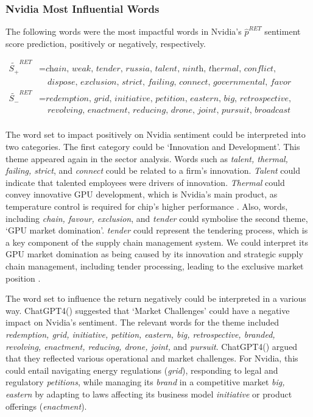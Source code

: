 \documentclass[logo,bsc,singlespacing,parskip]{infthesis}
\begin{document}
\subsubsection{Nvidia Most Influential Words} 



The following words were the most impactful words in Nvidia's $\hat{p}^{RET}$ sentiment score prediction, positively or negatively, respectively.

\begin{align*}
\tilde{S_{+}}^{RET} &= \textit{chain, weak, tender, russia, talent, ninth, thermal, conflict, } \\
               &\quad \textit{dispose, exclusion, strict, failing, connect, governmental, favor} \\
\tilde{S_{-}}^{RET} &= \textit{redemption, grid, initiative, petition, eastern, big, retrospective, branded, } \\
               &\quad \textit{revolving, enactment, reducing, drone, joint, pursuit, broadcast} \\
\end{align*}

The word set to impact positively on Nvidia sentiment could be interpreted into two categories. The first category could be ‘Innovation and Development’. This theme appeared again in the sector analysis. Words such as \textit{talent, thermal, failing, strict}, and \textit{connect} could be related to a firm’s innovation. \textit{Talent} could indicate that talented employees were drivers of innovation. \textit{Thermal} could convey innovative GPU development, which is Nvidia’s main product, as temperature control is required for chip's higher performance \cite{prakash2016improving}. Also, words, including \textit{chain, favour, exclusion}, and \textit{tender} could symbolise the second theme, ‘GPU market domination’. \textit{tender} could represent the tendering process, which is a key component of the supply chain management system. We could interpret its GPU market domination as being caused by its innovation and strategic supply chain management, including tender processing, leading to the exclusive market position \cite{leswing2023nvidia, nvidia2023supplychain}. 

The word set to influence the return negatively could be interpreted in a various way. ChatGPT4(\cite{openai2024chatgpt4}) suggested that ‘Market Challenges’ could have a negative impact on Nvidia’s sentiment. The relevant words for the theme included \textit{redemption, grid, initiative, petition, eastern, big, retrospective, branded, revolving, enactment, reducing, drone, joint,} and \textit{pursuit}. ChatGPT4(\cite{openai2024chatgpt4}) argued that they reflected various operational and market challenges. For Nvidia, this could entail navigating energy regulations (\textit{grid}), responding to legal and regulatory \textit{petitions}, while managing its \textit{brand} in a competitive market \textit{big, eastern} by adapting to laws affecting its business model \textit{initiative} or product offerings (\textit{enactment}).
\end{document}
